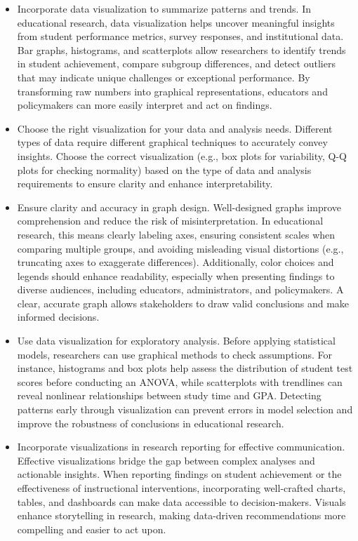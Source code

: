 \documentclass[
  letterpaper,
  DIV=11,
  numbers=noendperiod]{scrreprt}
\begin{document}
\begin{itemize}
\item
  Incorporate data visualization to summarize patterns and trends. In
  educational research, data visualization helps uncover meaningful
  insights from student performance metrics, survey responses, and
  institutional data. Bar graphs, histograms, and scatterplots allow
  researchers to identify trends in student achievement, compare
  subgroup differences, and detect outliers that may indicate unique
  challenges or exceptional performance. By transforming raw numbers
  into graphical representations, educators and policymakers can more
  easily interpret and act on findings.
\item
  Choose the right visualization for your data and analysis needs.
  Different types of data require different graphical techniques to
  accurately convey insights. Choose the correct visualization (e.g.,
  box plots for variability, Q-Q plots for checking normality) based on
  the type of data and analysis requirements to ensure clarity and
  enhance interpretability.
\item
  Ensure clarity and accuracy in graph design. Well-designed graphs
  improve comprehension and reduce the risk of misinterpretation. In
  educational research, this means clearly labeling axes, ensuring
  consistent scales when comparing multiple groups, and avoiding
  misleading visual distortions (e.g., truncating axes to exaggerate
  differences). Additionally, color choices and legends should enhance
  readability, especially when presenting findings to diverse audiences,
  including educators, administrators, and policymakers. A clear,
  accurate graph allows stakeholders to draw valid conclusions and make
  informed decisions.
\item
  Use data visualization for exploratory analysis. Before applying
  statistical models, researchers can use graphical methods to check
  assumptions. For instance, histograms and box plots help assess the
  distribution of student test scores before conducting an ANOVA, while
  scatterplots with trendlines can reveal nonlinear relationships
  between study time and GPA. Detecting patterns early through
  visualization can prevent errors in model selection and improve the
  robustness of conclusions in educational research.
\item
  Incorporate visualizations in research reporting for effective
  communication. Effective visualizations bridge the gap between complex
  analyses and actionable insights. When reporting findings on student
  achievement or the effectiveness of instructional interventions,
  incorporating well-crafted charts, tables, and dashboards can make
  data accessible to decision-makers. Visuals enhance storytelling in
  research, making data-driven recommendations more compelling and
  easier to act upon.
\end{itemize}
\end{document}
